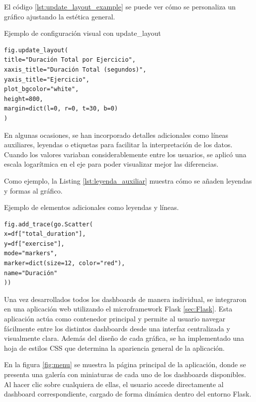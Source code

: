 \documentclass[a4paper, 12pt]{book}
\begin{document}
El código \ref{lst:update_layout_example} se puede ver cómo se personaliza un gráfico ajustando la estética general.

\begin{listing}[h!]
\caption{Ejemplo de configuración visual con update\_layout}
\label{lst:update_layout_example}
\begin{verbatim}
fig.update_layout(
title="Duración Total por Ejercicio",
xaxis_title="Duración Total (segundos)",
yaxis_title="Ejercicio",
plot_bgcolor="white",
height=800,
margin=dict(l=0, r=0, t=30, b=0)
)
\end{verbatim}
\end{listing}

En algunas ocasiones, se han incorporado detalles adicionales como líneas auxiliares, leyendas o etiquetas para facilitar la interpretación de los datos. Cuando los valores variaban considerablemente entre los usuarios, se aplicó una escala logarítmica en el eje para poder visualizar mejor las diferencias.

Como ejemplo, la Listing \ref{lst:leyenda_auxiliar} muestra cómo se añaden leyendas y formas al gráfico.

\begin{listing}[h!]
\caption{Ejemplo de elementos adicionales como leyendas y líneas.}{}
\label{lst:leyenda_auxiliar}
\begin{verbatim}
fig.add_trace(go.Scatter(
x=df["total_duration"],
y=df["exercise"],
mode="markers",
marker=dict(size=12, color="red"),
name="Duración"
))
\end{verbatim}
\end{listing}

Una vez desarrollados todos los dashboards de manera individual, se integraron en una aplicación web utilizando el microframework Flask \ref{sec:Flask}. Esta aplicación actúa como contenedor principal y permite al usuario navegar fácilmente entre los distintos dashboards desde una interfaz centralizada y visualmente clara.
Además del diseño de cada gráfica, se ha implementado una hoja de estilos CSS que determina la apariencia general de la aplicación.

En la figura \ref{fig:menu} se muestra la página principal de la aplicación, donde se presenta una galería con miniaturas de cada uno de los dashboards disponibles. Al hacer clic sobre cualquiera de ellas, el usuario accede directamente al dashboard correspondiente, cargado de forma dinámica dentro del entorno Flask.
\end{document}
